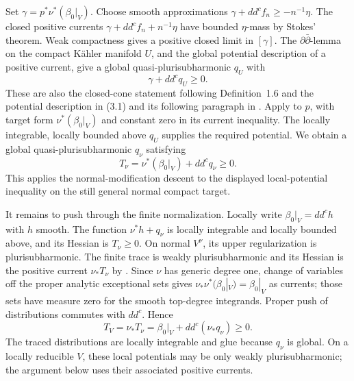 Set \(\gamma=p^*\nu^*(\beta_0|_V)\).  Choose smooth approximations
\(\gamma+dd^c f_n\geq-n^{-1}\eta\).  The closed positive currents
\(\gamma+dd^c f_n+n^{-1}\eta\) have bounded \(\eta\)-mass by
Stokes' theorem.  Weak compactness gives a positive closed limit in
\([\gamma]\).  The \(\partial\bar\partial\)-lemma on the compact
K\"ahler manifold \(U\), and the global potential description of a
positive current, give a global quasi-plurisubharmonic \(q_U\) with
\[
 \gamma+dd^c q_U\geq0.
\]
These are also the closed-cone statement following Definition~1.6 and
the potential description in (3.1) and its following paragraph in
\cite[pp.~1253 and 1260]{DemaillyPaun2004}.  Apply
\cite[Corollary~2.32 and its proof, p.~18]{DasHaconPaun2024} to \(p\), with target form
\(\nu^*(\beta_0|_V)\) and constant zero in its current inequality.
The locally integrable, locally bounded above \(q_U\) supplies the
required potential.  We obtain a global quasi-plurisubharmonic
\(q_\nu\) satisfying
\begin{equation}\label{eq:outer-normalized-current}
 T_\nu=\nu^*(\beta_0|_V)+dd^c q_\nu\geq0.
\end{equation}
This applies the normal-modification descent to the displayed
local-potential inequality on the still general normal compact target.

It remains to push through the finite normalization.  Locally write
\(\beta_0|_V=dd^c h\) with \(h\) smooth.  The function
\(\nu^*h+q_\nu\) is locally integrable and locally bounded above, and
its Hessian is \(T_\nu\geq0\).  On normal \(V^\nu\), its upper
regularization is plurisubharmonic.  The finite trace is weakly
plurisubharmonic and its Hessian is the positive current \(\nu_*T_\nu\)
by \cite[Corollary~1.11 and Proposition~1.13(a), p.~22]{Demailly1985}.
Since \(\nu\) has generic degree one, change of variables off the
proper analytic exceptional sets gives
\(\nu_*\nu^*(\beta_0|_V)=\beta_0|_V\) as currents; those sets have
measure zero for the smooth top-degree integrands.  Proper push of
distributions commutes with \(dd^c\).  Hence
\begin{equation}\label{eq:outer-finite-trace}
 T_V=\nu_*T_\nu
     =\beta_0|_V+dd^c(\nu_*q_\nu)\geq0.
\end{equation}
The traced distributions are locally integrable and glue because
\(q_\nu\) is global.  On a locally reducible \(V\), these local
potentials may be only weakly plurisubharmonic; the argument below uses
their associated positive currents.

